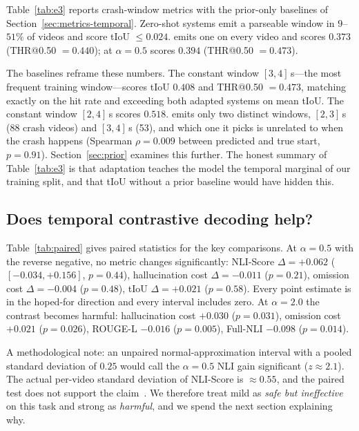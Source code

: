 Table~\ref{tab:e3} reports crash-window metrics with the prior-only baselines of Section~\ref{sec:metrics-temporal}.
Zero-shot systems emit a parseable window in $9$--$51\%$ of videos and score tIoU $\leq0.024$.
\crashlogic{} emits one on every video and scores $0.373$ (THR@0.50 $=0.440$); \tcd{} at $\alpha{=}0.5$ scores $0.394$ (THR@0.50 $=0.473$).



The baselines reframe these numbers.
The constant window $[3,4]$\,s---the most frequent training window---scores tIoU $0.408$ and THR@0.50 $=0.473$, matching \tcd{} exactly on the hit rate and exceeding both adapted systems on mean tIoU.
The constant window $[2,4]$\,s scores $0.518$.
\crashlogic{} emits only two distinct windows, $[2,3]$\,s (88 crash videos) and $[3,4]$\,s (53), and which one it picks is unrelated to when the crash happens (Spearman $\rho{=}0.009$ between predicted and true start, $p{=}0.91$).
Section~\ref{sec:prior} examines this further.
The honest summary of Table~\ref{tab:e3} is that adaptation teaches the model the temporal marginal of our training split, and that tIoU without a prior baseline would have hidden this.

\subsection{Does temporal contrastive decoding help?}
\label{sec:tcd-results}

Table~\ref{tab:paired} gives paired statistics for the key comparisons.
At $\alpha{=}0.5$ with the reverse negative, no metric changes significantly: NLI-Score $\Delta{=}{+}0.062$ ($[-0.034,+0.156]$, $p{=}0.44$), hallucination cost $\Delta{=}{-}0.011$ ($p{=}0.21$), omission cost $\Delta{=}{-}0.004$ ($p{=}0.48$), tIoU $\Delta{=}{+}0.021$ ($p{=}0.58$).
Every point estimate is in the hoped-for direction and every interval includes zero.
At $\alpha{=}2.0$ the contrast becomes harmful: hallucination cost $+0.030$ ($p{=}0.031$), omission cost $+0.021$ ($p{=}0.026$), ROUGE-L $-0.016$ ($p{=}0.005$), Full-NLI $-0.098$ ($p{=}0.014$).



A methodological note: an unpaired normal-approximation interval with a pooled standard deviation of $0.25$ would call the $\alpha{=}0.5$ NLI gain significant ($z\approx2.1$).
The actual per-video standard deviation of NLI-Score is $\approx0.55$, and the paired test does not support the claim~\cite{dror2018hitchhiker}.
We therefore treat mild \tcd{} as \emph{safe but ineffective} on this task and strong \tcd{} as \emph{harmful}, and we spend the next section explaining why.
